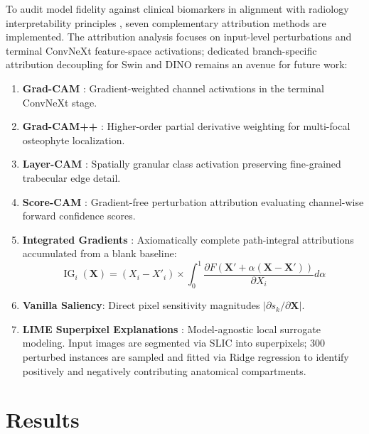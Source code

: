 \documentclass[10pt,journal]{IEEEtran}
\begin{document}
To audit model fidelity against clinical biomarkers in alignment with radiology interpretability principles \cite{reyes2020interpretability}, seven complementary attribution methods are implemented. The attribution analysis focuses on input-level perturbations and terminal ConvNeXt feature-space activations; dedicated branch-specific attribution decoupling for Swin and DINO remains an avenue for future work:
\begin{enumerate}[leftmargin=*, label=(\roman*)]
\item \textbf{Grad-CAM} \cite{selvaraju2017gradcam}: Gradient-weighted channel activations in the terminal ConvNeXt stage.
\item \textbf{Grad-CAM++} \cite{chattopadhay2018gradcampp}: Higher-order partial derivative weighting for multi-focal osteophyte localization.
\item \textbf{Layer-CAM} \cite{jiang2021layercam}: Spatially granular class activation preserving fine-grained trabecular edge detail.
\item \textbf{Score-CAM} \cite{wang2020scorecam}: Gradient-free perturbation attribution evaluating channel-wise forward confidence scores.
\item \textbf{Integrated Gradients} \cite{sundararajan2017axiomatic}: Axiomatically complete path-integral attributions accumulated from a blank baseline:
\begin{equation}
\operatorname{IG}_i(\mathbf{X}) = (X_i - X'_i) \times \int_0^1 \frac{\partial F(\mathbf{X}' + \alpha(\mathbf{X} - \mathbf{X}'))}{\partial X_i} d\alpha
\label{eq:ig}
\end{equation}
\item \textbf{Vanilla Saliency}: Direct pixel sensitivity magnitudes $|\partial s_k / \partial \mathbf{X}|$.
\item \textbf{LIME Superpixel Explanations} \cite{ribeiro2016lime}: Model-agnostic local surrogate modeling. Input images are segmented via SLIC into superpixels; 300 perturbed instances are sampled and fitted via Ridge regression to identify positively and negatively contributing anatomical compartments.
\end{enumerate}


\section{Results}
\label{sec:results}
\end{document}

